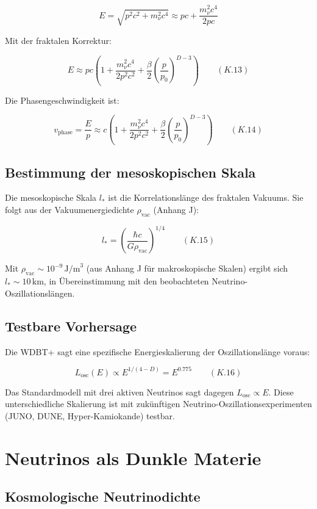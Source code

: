 \[
E = \sqrt{p^2 c^2 + m_{\nu}^2 c^4} \approx pc + \frac{m_{\nu}^2 c^4}{2pc}
\]

Mit der fraktalen Korrektur:

\[
E \approx pc \left(1 + \frac{m_{\nu}^2 c^4}{2p^2 c^2} + \frac{\beta}{2} \left(\frac{p}{p_0}\right)^{D-3}\right) \qquad (K.13)
\]

Die Phasengeschwindigkeit ist:

\[
v_{\text{phase}} = \frac{E}{p} \approx c \left(1 + \frac{m_{\nu}^2 c^4}{2p^2 c^2} + \frac{\beta}{2} \left(\frac{p}{p_0}\right)^{D-3}\right) \qquad (K.14)
\]

\subsection{Bestimmung der mesoskopischen Skala}

Die mesoskopische Skala $l_*$ ist die Korrelationslänge des fraktalen Vakuums.
Sie folgt aus der Vakuumenergiedichte $\rho_{\text{vac}}$ (Anhang J):

\[
l_* = \left( \frac{\hbar c}{G \rho_{\text{vac}}} \right)^{1/4} \qquad (K.15)
\]

Mit $\rho_{\text{vac}} \sim 10^{-9}\,\text{J/m}^3$ (aus Anhang J für makroskopische Skalen)
ergibt sich $l_* \sim 10\,\text{km}$, in Übereinstimmung mit den beobachteten 
Neutrino-Oszillationslängen.

\subsection{Testbare Vorhersage}

Die WDBT+ sagt eine spezifische Energieskalierung der Oszillationslänge voraus:

\[
L_{\text{osc}}(E) \propto E^{1/(4-D)} = E^{0.775} \qquad (K.16)
\]

Das Standardmodell mit drei aktiven Neutrinos sagt dagegen $L_{\text{osc}} \propto E$. 
Diese unterschiedliche Skalierung ist mit zukünftigen Neutrino-Oszillationsexperimenten 
(JUNO, DUNE, Hyper-Kamiokande) testbar.

\section{Neutrinos als Dunkle Materie}

\subsection{Kosmologische Neutrinodichte}

